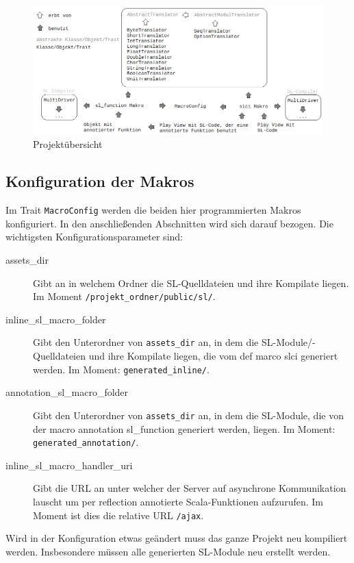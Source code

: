 \documentclass[12pt,bibtotoc]{scrreprt}
\begin{document}
\begin{figure}[h] 
  \centering
     \includegraphics[width=\textwidth]{Bilder/projektstruktur}
  \caption{Projektübersicht}
  \label{fig:project-overview}
\end{figure}

\subsection{Konfiguration der Makros}
\label{subsec:macro-config}

Im Trait \lstinline!MacroConfig! werden die beiden hier programmierten Makros konfiguriert. In den anschließenden Abschnitten wird sich darauf bezogen. Die wichtigsten Konfigurationsparameter sind:

\begin{description}
 \item[assets\_dir] Gibt an in welchem Ordner die SL-Quelldateien und ihre Kompilate liegen. Im Moment \lstinline!/projekt_ordner/public/sl/!.
 \item[inline\_sl\_macro\_folder] Gibt den Unterordner von \lstinline!assets_dir! an, in dem die SL-Module/-Quelldateien und ihre Kompilate liegen, die vom def marco slci generiert werden. Im Moment: \lstinline!generated_inline/!.
 \item[annotation\_sl\_macro\_folder] Gibt den Unterordner von \lstinline!assets_dir! an, in dem die SL-Module, die von der macro annotation sl\_function generiert werden, liegen. Im Moment: \lstinline!generated_annotation/!.
 \item[inline\_sl\_macro\_handler\_uri] Gibt die \ac{URL} an unter welcher der Server auf asynchrone Kommunikation lauscht um per reflection annotierte Scala-Funktionen aufzurufen. Im Moment ist dies die relative \ac{URL} \lstinline!/ajax!.
\end{description}

Wird in der Konfiguration etwas geändert muss das ganze Projekt neu kompiliert werden. Insbesondere müssen alle generierten SL-Module neu erstellt werden.
\end{document}
